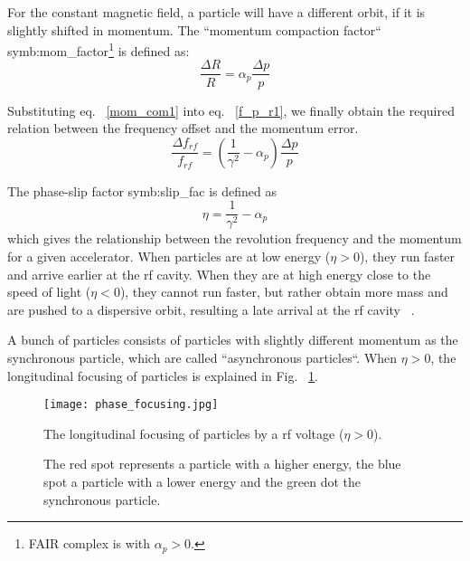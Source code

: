 For the constant magnetic field, a particle will have a different orbit, if it is slightly shifted in momentum. The ``momentum compaction factor`` \gls{symb:mom_factor}\footnote{FAIR complex is with $\alpha_p>0$.} is defined as:
\begin{equation}
\frac{\Delta R}{R}=\alpha_p\frac{\Delta p}{p}\label{mom_com1}
\end{equation} 


Substituting eq. ~\ref{mom_com1} into eq. ~\ref{f_p_r1}, we finally obtain the required relation between the frequency offset and the momentum error.
\begin{equation}
\frac{\Delta f_{\mathit{rf}}}{f_{\mathit{rf}}} = (\frac{1}{\gamma^2}-\alpha_{\mathit{p}})\frac{\Delta{p}}{p}
\label{eq:phaseP1}
\end{equation}

The phase-slip factor \gls{symb:slip_fac} is defined as
\begin{equation}
\label{eq:phse_slip}
\eta =\frac{1}{\gamma^2}-\alpha_{\mathit{p}}
\end{equation}
which gives the relationship between the revolution frequency and the momentum for a given accelerator. When particles are at low energy ($\eta > 0$), they run faster and arrive earlier at the rf cavity. When they are at high energy close to the speed of light ($\eta < 0$), they cannot run faster, but rather obtain more mass and are pushed to a dispersive orbit, resulting a late arrival at the rf cavity ~\cite{lee_accelerator_2011}. 

A bunch of particles consists of particles with slightly different momentum as the synchronous particle, which are called ``asynchronous particles``. When $\eta > 0$, the longitudinal focusing of particles is explained in Fig. ~\ref{phase_focusing}. 
\begin{figure}[!htb]
   \centering   
   \texttt{[image: phase\_focusing.jpg]}
   \caption{The longitudinal focusing of particles by a rf voltage ($\eta > 0$).}
	\caption*{The red spot represents a particle with a higher energy, the blue spot a particle with a lower energy and the green dot the synchronous particle.}
   \label{phase_focusing}
\end{figure}

